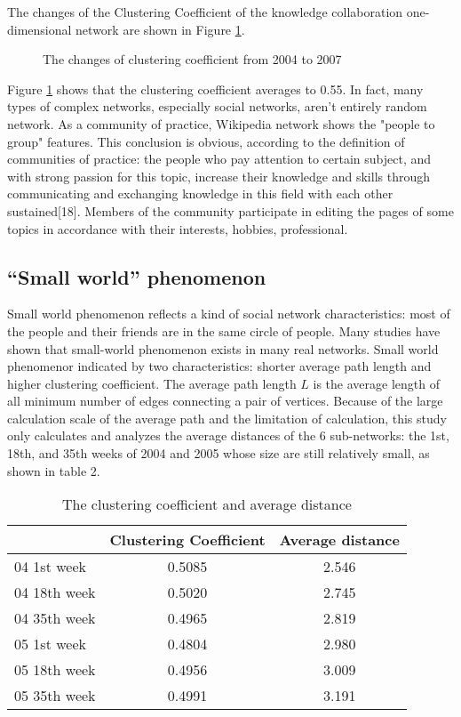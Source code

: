 \documentclass{elsarticle}
\begin{document}
The changes of the Clustering Coefficient of the knowledge
collaboration one-dimensional network are shown in Figure \ref{fig:cluster-coeff}.
\begin{figure}[htpb]

  \centering
  \scalebox{0.3}{\texttt{[image: 04]}}
  \caption{ The changes of clustering coefficient from 2004 to 2007}
    \label{fig:cluster-coeff}
\end{figure}
 
 Figure \ref{fig:cluster-coeff} 
shows that the clustering coefficient averages to 0.55. In fact, many
types of complex networks, especially social networks, aren’t entirely
random network. As a community of practice, Wikipedia network shows
the "people to group" features. This conclusion is obvious, according
to the definition of communities of practice: the people who pay
attention to certain subject, and with strong passion for this topic,
increase their knowledge and skills through communicating and
exchanging knowledge in this field with each other sustained[18].
Members of the community participate in editing the pages of some topics  in accordance with their interests, hobbies, professional. 



\subsection{“Small world” phenomenon }
\label{sec:small-world-phen}

Small world phenomenon reflects a kind of social network
characteristics: most of the people and their friends are in the same
circle of people. Many studies have shown that small-world phenomenon
exists in many real networks. Small world phenomenor indicated by two
characteristics: shorter average path length and higher clustering
coefficient. The average path length $L$ is the average length of
all minimum number of edges connecting a pair of vertices. Because of
the large calculation scale of the average path and the limitation of
calculation, this study only calculates and analyzes the average
distances of the 6 sub-networks: the 1st, 18th, and 35th weeks of
2004 and 2005 whose size are still relatively small, as shown in table
2.

\begin{table}[htpb]
  \centering
 \caption{The clustering coefficient and average distance} 
 \begin{tabular}{lcc}
   \toprule
    &Clustering Coefficient&Average distance\\\hline
  04 1st week&0.5085&2.546\\
  04 18th week&0.5020&2.745\\
  04 35th week&0.4965&2.819\\
  05 1st week&0.4804&2.980\\
  05 18th week&0.4956&3.009\\
  05 35th week&0.4991&3.191\\\bottomrule
   \end{tabular}
 \label{tab:small-world}
\end{table}
\end{document}
